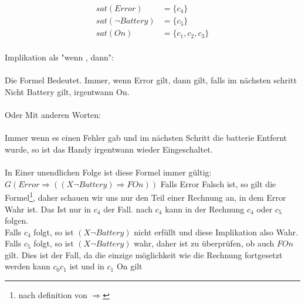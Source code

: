 \begin{align*}
sat(Error)&=\{c_4\}\\
sat(\neg Battery)&=\{c_5\}\\
sat(On)&=\{c_1,c_2,c_3\}\\
\end{align*}


Implikation als "{}wenn , dann"{}:\\
\\
Die Formel Bedeutet. Immer, wenn Error gilt, dann gilt, falls im nächsten schritt Nicht Battery gilt, irgentwann On.\\
\\
Oder Mit anderen Worten:\\
\\
Immer wenn es einen Fehler gab und im nächsten Schritt die batterie Entfernt wurde, so ist das Handy irgentwann wieder Eingeschaltet.\\
\\
In Einer unendlichen Folge ist diese Formel immer gültig:
$G(Error \Rightarrow ((X\neg Battery)\Rightarrow FOn))$
Falls Error Falsch ist, so gilt die Formel\footnote{nach definition von $\Rightarrow$}, daher schauen wir uns nur den Teil einer Rechnung an, in dem Error Wahr ist. Das Ist nur in $c_4$ der Fall. nach $c_4$ kann in der Rechnung $c_4$ oder $c_5$ folgen.\\
Falls $c_4$ folgt, so ist $(X\neg Battery)$ nicht erfüllt und diese Implikation also Wahr.\\
Falls $c_5$ folgt, so ist $(X\neg Battery)$ wahr, daher ist zu überprüfen, ob auch $FOn$ gilt. Dies ist der Fall, da die einzige möglichkeit wie die Rechnung fortgesetzt werden kann $c_0c_1$ ist und in $c_1$ On gilt